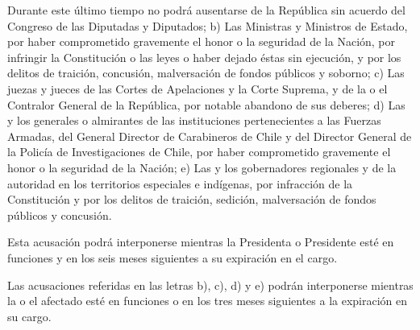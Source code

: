 \documentclass[11pt, a4paper]{article}
\begin{document}
\begin{enumerate}
Durante este último tiempo no podrá ausentarse de la República sin acuerdo del Congreso de las Diputadas y Diputados; b) Las Ministras y Ministros de Estado, por haber comprometido gravemente el honor o la seguridad de la Nación, por infringir la Constitución o las leyes o haber dejado éstas sin ejecución, y por los delitos de traición, concusión, malversación de fondos públicos y soborno; c) Las juezas y jueces de las Cortes de Apelaciones y la Corte Suprema, y de la o el Contralor General de la República, por notable abandono de sus deberes; d) Las y los generales o almirantes de las instituciones pertenecientes a las Fuerzas Armadas, del General Director de Carabineros de Chile y del Director General de la Policía de Investigaciones de Chile, por haber comprometido gravemente el honor o la seguridad de la Nación; e) Las y los gobernadores regionales y de la autoridad en los territorios especiales e indígenas, por infracción de la Constitución y por los delitos de traición, sedición, malversación de fondos públicos y concusión. 

Esta acusación podrá interponerse mientras la Presidenta o Presidente esté en funciones y en los seis meses siguientes a su expiración en el cargo. 

Las acusaciones referidas en las letras b), c), d) y e) podrán interponerse mientras la o el afectado esté en funciones o en los tres meses siguientes a la expiración en su cargo. 



\end{enumerate}
\end{document}
